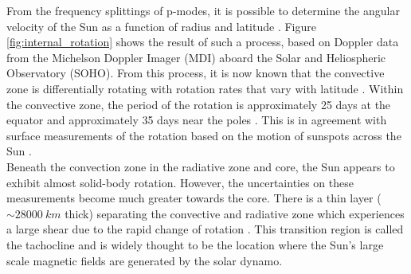 \documentclass[11pt,a4paper,onecolumn]{report}
\begin{document}

From the frequency splittings of p-modes, it is possible to determine the
angular velocity of the Sun as a function of radius and latitude
\citep{schou_helioseismic_1998}. Figure \ref{fig:internal_rotation} shows the
result of such a process, based on Doppler data from the Michelson Doppler
Imager (MDI) aboard the Solar and Heliospheric Observatory (SOHO). From this
process, it is now known that the convective zone is differentially rotating
with rotation rates that vary with latitude \citep{eff2012dynamics}. Within the
convective zone, the period of the rotation is approximately 25 days at the
equator and approximately 35 days near the poles \citep{hughes2007solar}. This
is in agreement with surface measurements of the rotation based on the motion of
sunspots across the Sun \citep{schou_helioseismic_1998}. \\


Beneath the convection zone in the radiative zone and core, the Sun appears to
exhibit almost solid-body rotation. However, the uncertainties on these
measurements become much greater towards the core. There is a thin layer
(\(\sim \SI{28000}{km}\) thick) separating the convective and radiative zone which
experiences a large shear due to the rapid change of rotation
\citep{spiegel1992}. This transition region is called the tachocline and is
widely thought to be the location where the Sun's large scale magnetic fields are
generated by the solar dynamo.
\end{document}
